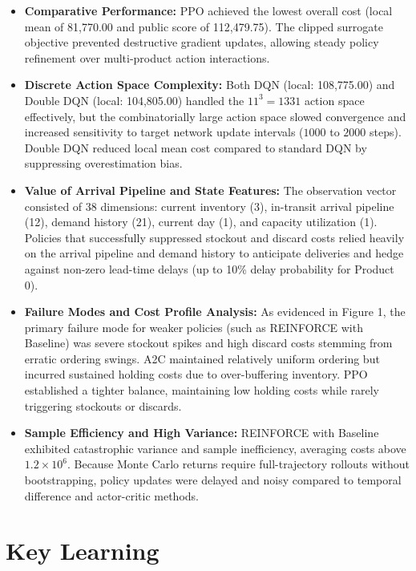 \documentclass[11pt,a4paper]{article}
\begin{document}
\begin{itemize}
    \item \textbf{Comparative Performance:} PPO achieved the lowest overall cost (local mean of 81,770.00 and public score of 112,479.75). The clipped surrogate objective prevented destructive gradient updates, allowing steady policy refinement over multi-product action interactions.
    \item \textbf{Discrete Action Space Complexity:} Both DQN (local: 108,775.00) and Double DQN (local: 104,805.00) handled the $11^3 = 1331$ action space effectively, but the combinatorially large action space slowed convergence and increased sensitivity to target network update intervals ($1000$ to $2000$ steps). Double DQN reduced local mean cost compared to standard DQN by suppressing overestimation bias.
    \item \textbf{Value of Arrival Pipeline and State Features:} The observation vector consisted of 38 dimensions: current inventory (3), in-transit arrival pipeline (12), demand history (21), current day (1), and capacity utilization (1). Policies that successfully suppressed stockout and discard costs relied heavily on the arrival pipeline and demand history to anticipate deliveries and hedge against non-zero lead-time delays (up to 10\% delay probability for Product 0).
    \item \textbf{Failure Modes and Cost Profile Analysis:} As evidenced in Figure 1, the primary failure mode for weaker policies (such as REINFORCE with Baseline) was severe stockout spikes and high discard costs stemming from erratic ordering swings. A2C maintained relatively uniform ordering but incurred sustained holding costs due to over-buffering inventory. PPO established a tighter balance, maintaining low holding costs while rarely triggering stockouts or discards.
    \item \textbf{Sample Efficiency and High Variance:} REINFORCE with Baseline exhibited catastrophic variance and sample inefficiency, averaging costs above $1.2 \times 10^6$. Because Monte Carlo returns require full-trajectory rollouts without bootstrapping, policy updates were delayed and noisy compared to temporal difference and actor-critic methods.
\end{itemize}

\section{Key Learning}
\end{document}
